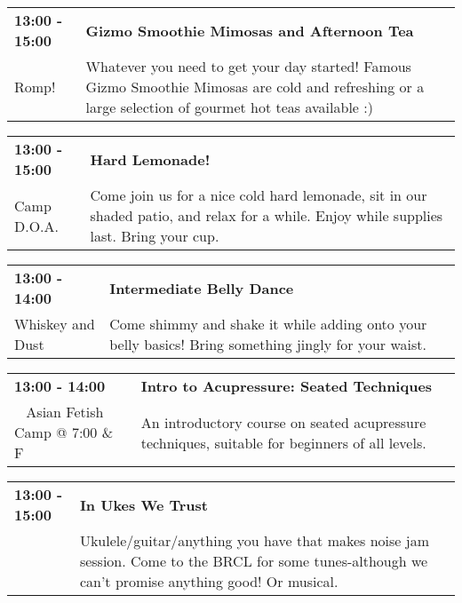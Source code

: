 \begin{tabular}{ p{1in} p{2.2in} }
    \textbf{13:00 - 15:00} & \textbf{Gizmo Smoothie Mimosas and Afternoon Tea} \\
    Romp! \newline  & Whatever you need to get your day started! Famous Gizmo Smoothie Mimosas are cold and refreshing or a large selection of gourmet hot teas available :) \\
    \hline 
\end{tabular}
    
\begin{tabular}{ p{1in} p{2.2in} }
    \textbf{13:00 - 15:00} & \textbf{Hard Lemonade!} \\
    Camp D.O.A. \newline  & Come join us for a nice cold hard lemonade, sit in our shaded patio, and relax for a while. Enjoy while supplies last. Bring your cup. \\
    \hline 
\end{tabular}
    
\begin{tabular}{ p{1in} p{2.2in} }
    \textbf{13:00 - 14:00} & \textbf{Intermediate Belly Dance} \\
    Whiskey and Dust \newline  & Come shimmy and shake it while adding onto your belly basics! Bring something jingly for your waist. \\
    \hline 
\end{tabular}
    
\begin{tabular}{ p{1in} p{2.2in} }
    \textbf{13:00 - 14:00} & \textbf{Intro to Acupressure: Seated Techniques} \\
    ~ \newline Asian Fetish Camp @ 7:00 \& F & An introductory course on seated acupressure techniques, suitable for beginners of all levels. \\
    \hline 
\end{tabular}
    
\begin{tabular}{ p{1in} p{2.2in} }
    \textbf{13:00 - 15:00} & \textbf{In Ukes We Trust} \\
    ~ \newline  & Ukulele/guitar/anything you have that makes noise jam session.  Come to the BRCL for some tunes-although we can't promise anything good! Or musical. \\
    \hline 
\end{tabular}
    
